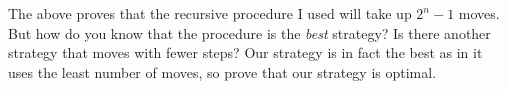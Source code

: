   The above proves that the recursive procedure I used
  will take up $2^n - 1$ moves.
  But how do you know that the procedure is the \textit{best}
  strategy?
  Is there another strategy that moves with fewer steps?
  Our strategy is in fact the best as in it uses the least
  number of moves, so prove that our strategy is optimal.
